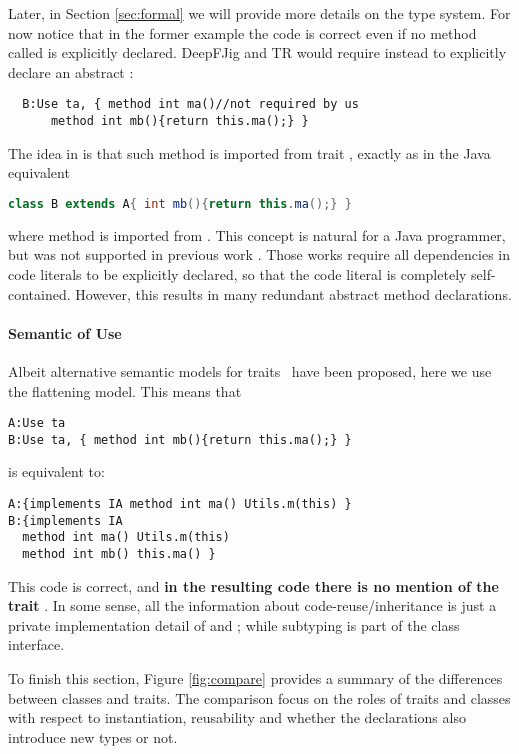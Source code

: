 Later, in Section \ref{sec:formal} we will provide more details on the type
system. 
For now notice that in the former example the code is correct even if
no method called \Q@ma@ is explicitly declared.
DeepFJig and TR would require instead to explicitly declare an abstract \Q@ma@:
\saveSpace
\begin{lstlisting}
  B:Use ta, { method int ma()//not required by us
      method int mb(){return this.ma();} }
\end{lstlisting}\saveSpace
\noindent
The idea in \name is that such method is imported from trait \Q@ta@, exactly as in the Java equivalent
\saveSpace\begin{lstlisting}[language=Java]
  class B extends A{ int mb(){return this.ma();} }  
\end{lstlisting}
\saveSpace
where method \Q@ma@ is imported from \Q@A@.
This concept is natural for a Java programmer, but was not supported
in previous work \cite{BETTINI2013521,deep}. Those works require all
dependencies in code literals to be explicitly declared, so that the
code literal is completely self-contained. However, this results in
many redundant abstract method declarations.

\paragraph{Semantic of Use}
Albeit alternative semantic models for traits~\cite{Traits:ECOOP2003} have been proposed,
here we use the flattening model. This means that 
\saveSpace\begin{lstlisting}
A:Use ta
B:Use ta, { method int mb(){return this.ma();} }
\end{lstlisting}\saveSpace
 
\noindent is equivalent to:
  
\saveSpace \begin{lstlisting}
A:{implements IA method int ma() Utils.m(this) }
B:{implements IA
  method int ma() Utils.m(this)
  method int mb() this.ma() } 
 \end{lstlisting}
\saveSpace 
 This code is correct, and {\bf in the resulting code there is no mention of the trait
 \Q@ta@}. In some sense, all the information about code-reuse/inheritance
  is just a private implementation detail of \Q@A@
 and \Q@B@; while subtyping is part of the class interface.


To finish this section, Figure \ref{fig:compare} provides a summary of
the differences between classes and traits. The comparison focus on
the roles of traits and classes with respect to instantiation,
reusability and whether the declarations also introduce new types or
not.




